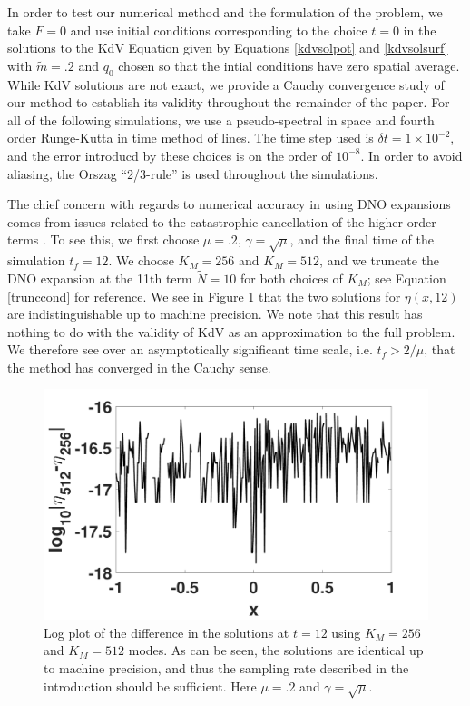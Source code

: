 \documentclass[a4paper,11pt]{article}
\begin{document}
In order to test our numerical method and the formulation of the problem, we take $F=0$ and use initial conditions corresponding to the choice $t=0$ in the solutions to the KdV Equation given by Equations \eqref{kdvsolpot} and \eqref{kdvsolsurf} with $\tilde{m}=.2$ and $q_{0}$ chosen so that the intial conditions have zero spatial average.  While KdV solutions are not exact, we provide a Cauchy convergence study of our method to establish its validity throughout the remainder of the paper.  For all of the following simulations, we use a pseudo-spectral in space and fourth order Runge-Kutta in time method of lines.  The time step used is $\delta t = 1\times 10^{-2}$, and the error introducd by these choices is on the order of $10^{-8}$.  In order to avoid aliasing, the Orszag ``2/3-rule'' is used throughout the simulations. 

The chief concern with regards to numerical accuracy in using DNO expansions comes from issues related to the catastrophic cancellation of the higher order terms \cite{wilkening}. To see this, we first choose $\mu=.2$, $\gamma=\sqrt{\mu}$, and the final time of the simulation $t_{f}=12$.  We choose $K_{M}=256$ and $K_{M}=512$, and we truncate the DNO expansion at the 11th term $\tilde{N}=10$ for both choices of $K_{M}$; see Equation \eqref{trunccond} for reference.  We see in Figure \ref{fig:convcomp} that the two solutions for $\eta(x,12)$ are indistinguishable up to machine precision.  We note that this result has nothing to do with the validity of KdV as an approximation to the full problem.  We therefore see over an asymptotically significant time scale, i.e. $t_{f} > 2/\mu$, that the method has converged in the Cauchy sense.    
\begin{figure}[h]
\centering
\includegraphics[width=.48\textwidth]{conv_plot_tf_12}
\caption{Log plot of the difference in the solutions at $t = 12$ using $K_{M}=256$ and $K_{M}=512$ modes.  As can be seen, the solutions are identical up to machine precision, and thus the sampling rate described in the introduction should be sufficient.  Here $\mu=.2$ and $\gamma=\sqrt{\mu}$.}
\label{fig:convcomp}
\end{figure}
\end{document}
